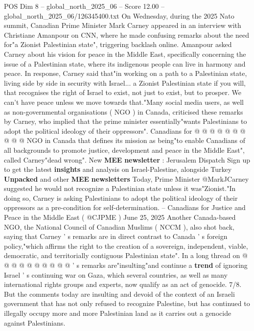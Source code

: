 \begin{textsample}{POS Dim 8 – global\_north\_2025\_06 – Score 12.00 – global\_north\_2025\_06/126345400.txt}  \label{ex:f8_pos_048}
On Wednesday, during the 2025 Nato summit, Canadian Prime Minister Mark Carney appeared in an interview with Christiane Amanpour on CNN, where he made confusing remarks about the need for"a Zionist Palestinian state", triggering backlash online.
Amanpour asked Carney about his vision for peace in the Middle East, specifically concerning the issue of a Palestinian state, where its indigenous people can live in harmony and peace.
In response, Carney said that"in working on a path to a Palestinian state, living side by side in security with Israel... a Zionist Palestinian state if you will, that recognises the right of Israel to exist, not just to exist, but to prosper.
We can't have peace unless we move towards that."Many social media users, as well as non-governmental organisations ( NGO ) in Canada, criticised these remarks by Carney, who implied that the prime minister essentially"wants Palestinians to adopt the political ideology of their oppressors".
Canadians for @ @ @ @ @ @ @ @ @ @ NGO in Canada that defines its mission as being"to enable Canadians of all backgrounds to promote justice, development and peace in the Middle East", called Carney"dead wrong".
New \textbf{MEE} \textbf{newsletter} : Jerusalem Dispatch Sign up to get the latest \textbf{insights} and analysis on Israel-Palestine, alongside Turkey \textbf{Unpacked} and other \textbf{MEE} \textbf{newsletters} Today, Prime Minister @MarkJCarney suggested he would not recognize a Palestinian state unless it was"Zionist."In doing so, Carney is asking Palestinians to adopt the political ideology of their oppressors as a pre-condition for self-determination. -- Canadians for Justice and Peace in the Middle East ( @CJPME ) June 25, 2025 Another Canada-based NGO, the National Council of Canadian Muslims ( NCCM ), also shot back, saying that Carney ' s remarks are in direct contrast to Canada ' s foreign policy,"which affirms the right to the creation of a sovereign, independent, viable, democratic, and territorially contiguous Palestinian state".
In a long thread on @ @ @ @ @ @ @ @ @ @ ' s remarks are"insulting"and continue a \textbf{trend} of ignoring Israel ' s continuing war on Gaza, which several countries, as well as many international rights groups and experts, now qualify as an act of genocide. 7/8.
But the comments today are insulting and devoid of the context of an Israeli government that has not only refused to recognize Palestine, but has continued to illegally occupy more and more Palestinian land as it carries out a genocide against Palestinians.

\end{textsample}
